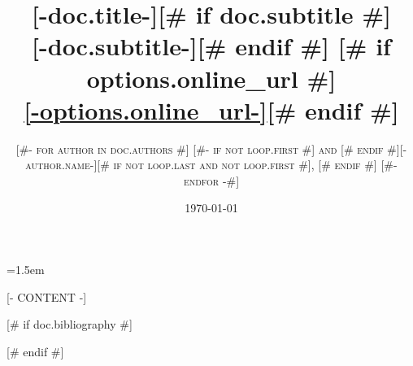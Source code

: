 \documentclass[a4paper,11pt,oneside]{book}
\title{\Huge \textbf{[-doc.title-]}[# if doc.subtitle #] \\[1ex] \huge [-doc.subtitle-][# endif #]%
[# if options.online_url #]\\[3ex] \normalsize \url{[-options.online_url-]}[# endif #]}
\author{\textsc{
[#- for author in doc.authors #]
  [#- if not loop.first #] and [# endif #][-author.name-][# if not loop.last and not loop.first #], [# endif #]
[#- endfor -#]
}}
\date{\today}
\numberwithin{equation}{chapter}
\begin{document}
\sloppy
\emergencystretch=1.5em

\frontmatter
\maketitle
\tableofcontents

\mainmatter
\setcounter{chapter}{[-options.first_chapter-]}
\addtocounter{chapter}{-1}

[- CONTENT -]

[# if doc.bibliography #]

[# endif #]
\end{document}
